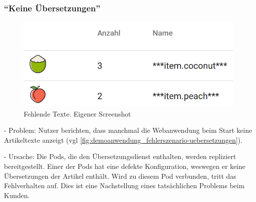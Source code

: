 \pagebreak

\subsubsection{\enquote{Keine Übersetzungen}}
\label{subsec:keine-uebersetzungen}

\begin{figure}
\centering
\vspace{-\baselineskip}
\includegraphics[width=\linewidth]{img/04_erstellung-poc/demoanwendung_fehlerszenario-uebersetzungen}
\caption{Fehlende Texte. Eigener Screenshot}
\label{fig:demoanwendung_fehlerszenario-uebersetzungen}
\end{figure}

- Problem: Nutzer berichten, dass manchmal die Webanwendung beim Start keine Artikeltexte anzeigt (vgl \autoref{fig:demoanwendung_fehlerszenario-uebersetzungen}).

- Ursache: Die Pods, die den Übersetzungsdienst enthalten, werden repliziert bereitgestellt. Einer der Pods hat eine defekte Konfiguration, weswegen er keine Übersetzungen der Artikel enthält. Wird zu diesem Pod verbunden, tritt das Fehlverhalten auf. Dies ist eine Nachstellung eines tatsächlichen Problems beim Kunden.

%
%

%
%

